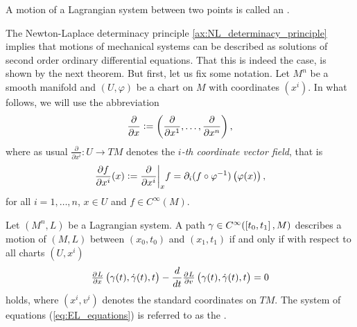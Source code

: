 \begin{definition}[Extremal]
	A motion of a Lagrangian system between two points is called an .
\end{definition}

The Newton-Laplace determinacy principle \ref{ax:NL_determinacy_principle} implies that motions of mechanical systems can be described as solutions of second order ordinary differential equations. That this is indeed the case, is shown by the next theorem. But first, let us fix some notation. Let $M^n$ be a smooth manifold and $(U,\varphi)$ be a chart on $M$ with coordinates $(x^i)$. In what follows, we will use the abbreviation
\begin{equation*}
	\frac{\partial}{\partial x} := \del[3]{\frac{\partial}{\partial x^1},\dots,\frac{\partial}{\partial x^n}},
\end{equation*}
\noindent where as usual $\frac{\partial}{\partial x^i} : U \to TM$ denotes the \emph{$i$-th coordinate vector field}, that is
\begin{equation*}
	\frac{\partial f}{\partial x^i}(x) := \frac{\partial}{\partial x^i}\bigg\vert_x f = \partial_i(f \circ \varphi^{-1})\del[1]{\varphi(x)},
\end{equation*}
\noindent for all $i = 1,\dots,n$, $x \in U$ and $f \in C^\infty(M)$.

\begin{theorem}
	\label{thm:EL_equations}
	Let $(M^n,L)$ be a Lagrangian system. A path $\gamma \in C^\infty(\intcc[0]{t_0,t_1},M)$ describes a motion of $(M,L)$ between $(x_0,t_0)$ and $(x_1,t_1)$ if and only if with respect to all charts $(U,x^i)$
	\begin{equation}
		\label{eq:EL_equations}
		\pd{L}{x}\del[1]{\gamma(t),\dot{\gamma}(t),t} - \frac{d}{dt} \pd{L}{v}\del[1]{\gamma(t),\dot{\gamma}(t),t} = 0
	\end{equation}
	\noindent holds, where $(x^i,v^i)$ denotes the standard coordinates on $TM$. The system of equations \textup{(}\ref{eq:EL_equations}\textup{)} is referred to as the .
\end{theorem}

